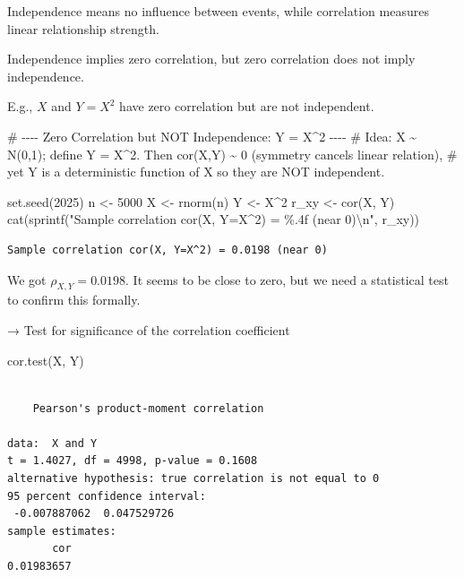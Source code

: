 \documentclass[
  12pt,
  letterpaper,
]{scrbook}
\newenvironment{Shaded}{\begin{snugshade}}{\end{snugshade}}
\newcommand{\CommentTok}[1]{\textcolor[rgb]{0.37,0.37,0.37}{#1}}
\newcommand{\DecValTok}[1]{\textcolor[rgb]{0.68,0.00,0.00}{#1}}
\newcommand{\FunctionTok}[1]{\textcolor[rgb]{0.28,0.35,0.67}{#1}}
\newcommand{\NormalTok}[1]{\textcolor[rgb]{0.00,0.23,0.31}{#1}}
\newcommand{\OtherTok}[1]{\textcolor[rgb]{0.00,0.23,0.31}{#1}}
\newcommand{\SpecialCharTok}[1]{\textcolor[rgb]{0.37,0.37,0.37}{#1}}
\newcommand{\StringTok}[1]{\textcolor[rgb]{0.13,0.47,0.30}{#1}}
\theoremstyle{definition}
\theoremstyle{plain}
\theoremstyle{remark}
\begin{document}
Independence means no influence between events, while correlation
measures linear relationship strength.

Independence implies zero correlation, but zero correlation does not
imply independence.

E.g., \(X\) and \(Y = X^2\) have zero correlation but are not
independent.

\begin{Shaded}
\begin{Highlighting}[]
\CommentTok{\# {-}{-}{-}{-} Zero Correlation but NOT Independence: Y = X\^{}2 {-}{-}{-}{-}}
\CommentTok{\# Idea: X \textasciitilde{} N(0,1); define Y = X\^{}2.  Then cor(X,Y) \textasciitilde{} 0 (symmetry cancels linear relation),}
\CommentTok{\# yet Y is a deterministic function of X so they are NOT independent.}

\FunctionTok{set.seed}\NormalTok{(}\DecValTok{2025}\NormalTok{)}
\NormalTok{n }\OtherTok{\textless{}{-}} \DecValTok{5000}
\NormalTok{X }\OtherTok{\textless{}{-}} \FunctionTok{rnorm}\NormalTok{(n)}
\NormalTok{Y }\OtherTok{\textless{}{-}}\NormalTok{ X}\SpecialCharTok{\^{}}\DecValTok{2}
\NormalTok{r\_xy }\OtherTok{\textless{}{-}} \FunctionTok{cor}\NormalTok{(X, Y)}
\FunctionTok{cat}\NormalTok{(}\FunctionTok{sprintf}\NormalTok{(}\StringTok{"Sample correlation cor(X, Y=X\^{}2) = \%.4f (near 0)}\SpecialCharTok{\textbackslash{}n}\StringTok{"}\NormalTok{, r\_xy))}
\end{Highlighting}
\end{Shaded}

\begin{verbatim}
Sample correlation cor(X, Y=X^2) = 0.0198 (near 0)
\end{verbatim}

We got \(\rho_{X,Y}=0.0198\). It seems to be close to zero, but we need
a statistical test to confirm this formally.

→ Test for significance of the correlation coefficient

\begin{Shaded}
\begin{Highlighting}[]
\FunctionTok{cor.test}\NormalTok{(X, Y)}
\end{Highlighting}
\end{Shaded}

\begin{verbatim}

    Pearson's product-moment correlation

data:  X and Y
t = 1.4027, df = 4998, p-value = 0.1608
alternative hypothesis: true correlation is not equal to 0
95 percent confidence interval:
 -0.007887062  0.047529726
sample estimates:
       cor 
0.01983657 
\end{verbatim}
\end{document}
